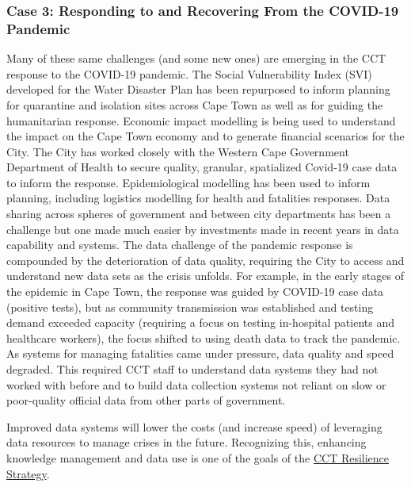 \documentclass[
]{book}
\begin{document}
\hypertarget{case-3-responding-to-and-recovering-from-the-covid-19-pandemic}{%
\subsubsection*{Case 3: Responding to and Recovering From the COVID-19 Pandemic}\label{case-3-responding-to-and-recovering-from-the-covid-19-pandemic}}

Many of these same challenges (and some new ones) are emerging in the CCT response to the COVID-19 pandemic. The Social Vulnerability Index (SVI) developed for the Water Disaster Plan has been repurposed to inform planning for quarantine and isolation sites across Cape Town as well as for guiding the humanitarian response. Economic impact modelling is being used to understand the impact on the Cape Town economy and to generate financial scenarios for the City. The City has worked closely with the Western Cape Government Department of Health to secure quality, granular, spatialized Covid-19 case data to inform the response. Epidemiological modelling has been used to inform planning, including logistics modelling for health and fatalities responses. Data sharing across spheres of government and between city departments has been a challenge but one made much easier by investments made in recent years in data capability and systems. The data challenge of the pandemic response is compounded by the deterioration of data quality, requiring the City to access and understand new data sets as the crisis unfolds. For example, in the early stages of the epidemic in Cape Town, the response was guided by COVID-19 case data (positive tests), but as community transmission was established and testing demand exceeded capacity (requiring a focus on testing in-hospital patients and healthcare workers), the focus shifted to using death data to track the pandemic. As systems for managing fatalities came under pressure, data quality and speed degraded. This required CCT staff to understand data systems they had not worked with before and to build data collection systems not reliant on slow or poor-quality official data from other parts of government.

Improved data systems will lower the costs (and increase speed) of leveraging data resources to manage crises in the future. Recognizing this, enhancing knowledge management and data use is one of the goals of the \href{https://resource.capetown.gov.za/documentcentre/Documents/City\%20strategies\%2C\%20plans\%20and\%20frameworks/Resilience_Strategy.pdf}{CCT Resilience Strategy}.
\end{document}
